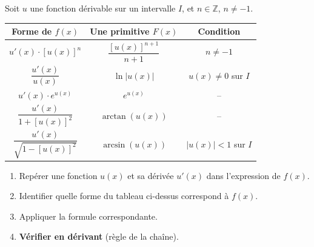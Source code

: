 \documentclass[11pt]{article}
\begin{document}
\begin{propriete}
Soit $u$ une fonction dérivable sur un intervalle $I$, et $n \in \mathbb{Z}$, $n \neq -1$.
\begin{center}
\begin{tabular}{|c|c|c|}
\hline
\rowcolor{popblue!40} \textbf{Forme de $f(x)$} & \textbf{Une primitive $F(x)$} & \textbf{Condition} \\
\hline
$u'(x) \cdot [u(x)]^n$ & $\dfrac{[u(x)]^{n+1}}{n+1}$ & $n \neq -1$ \\
\hline
$\dfrac{u'(x)}{u(x)}$ & $\ln|u(x)|$ & $u(x) \neq 0$ sur $I$ \\
\hline
$u'(x) \cdot e^{u(x)}$ & $e^{u(x)}$ & -- \\
\hline
$\dfrac{u'(x)}{1+[u(x)]^2}$ & $\arctan(u(x))$ & -- \\
\hline
$\dfrac{u'(x)}{\sqrt{1-[u(x)]^2}}$ & $\arcsin(u(x))$ & $|u(x)| < 1$ sur $I$ \\
\hline
\end{tabular}
\end{center}
\end{propriete}

\begin{methode}
\begin{enumerate}
  \item Repérer une fonction $u(x)$ et sa dérivée $u'(x)$ dans l'expression de $f(x)$.
  \item Identifier quelle forme du tableau ci-dessus correspond à $f(x)$.
  \item Appliquer la formule correspondante.
  \item \textbf{Vérifier en dérivant} (règle de la chaîne).
\end{enumerate}
\end{methode}
\end{document}
